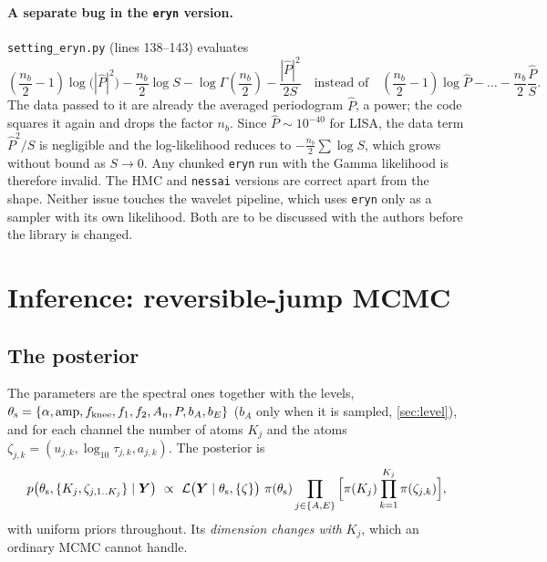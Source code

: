 \documentclass[11pt,a4paper]{article}
\newcommand{\Pbar}{\hat{P}}
\begin{document}
\paragraph{A separate bug in the \texttt{eryn} version.} \texttt{setting\_eryn.py}
(lines 138--143) evaluates
\[
  \left(\frac{n_b}{2}-1\right)\log\big(|\Pbar|^2\big) - \frac{n_b}{2}\log S - \log\Gamma\!\left(\frac{n_b}{2}\right) - \frac{|\Pbar|^2}{2S}
  \quad\text{instead of}\quad
  \left(\frac{n_b}{2}-1\right)\log\Pbar - \dots - \frac{n_b}{2}\frac{\Pbar}{S}.
\]
The data passed to it are already the averaged periodogram $\Pbar$, a power; the code
squares it again and drops the factor $n_b$. Since $\Pbar\sim10^{-40}$ for LISA, the
data term $\Pbar^2/S$ is negligible and the log-likelihood reduces to
$-\frac{n_b}{2}\sum\log S$, which grows without bound as $S\to0$. Any chunked
\texttt{eryn} run with the Gamma likelihood is therefore invalid. The HMC and
\texttt{nessai} versions are correct apart from the shape. Neither issue touches the
wavelet pipeline, which uses \texttt{eryn} only as a sampler with its own likelihood.
Both are to be discussed with the authors before the library is changed.

\section{Inference: reversible-jump MCMC}\label{sec:rj}

\subsection{The posterior}

The parameters are the spectral ones together with the levels,
$\theta_{\rm s}=\{\alpha,\mathrm{amp},f_{\rm knee},f_1,f_2,A_{\rm n},P,b_A,b_E\}$
($b_A$ only when it is sampled, \cref{sec:level}), and for each channel the number of atoms $K_j$ and the atoms
$\zeta_{j,k}=(u_{j,k},\log_{10}\tau_{j,k},a_{j,k})$. The posterior is
\begin{equation}
  p\big(\theta_{\rm s},\{K_j,\zeta_{j,1..K_j}\}\mid\boldsymbol Y\big)\ \propto\
  \mathcal L\big(\boldsymbol Y\mid\theta_{\rm s},\{\zeta\}\big)\ \pi(\theta_{\rm s})
  \prod_{j\in\{A,E\}}\Big[\pi(K_j)\prod_{k=1}^{K_j}\pi(\zeta_{j,k})\Big],
\end{equation}
with uniform priors throughout. Its \emph{dimension changes with} $K_j$, which an
ordinary MCMC cannot handle.
\end{document}
